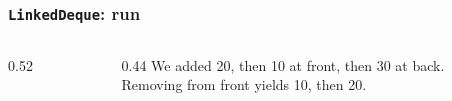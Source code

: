 \documentclass[aspectratio=169,10pt,compress]{beamer}
\begin{document}
\begin{frame}[t,fragile]\frametitle{\texttt{LinkedDeque}: run}
  \begin{columns}[T]
    \begin{column}{0.52\textwidth}
    \end{column}
    \begin{column}{0.44\textwidth}
      \small
      We added 20, then 10 at front, then 30 at back.\\
      Removing from front yields 10, then 20.
    \end{column}
  \end{columns}
\end{frame}

\begin{frame}[t,fragile]
  \begin{center}\vspace{4cm}\end{center}
\end{frame}
\end{document}
